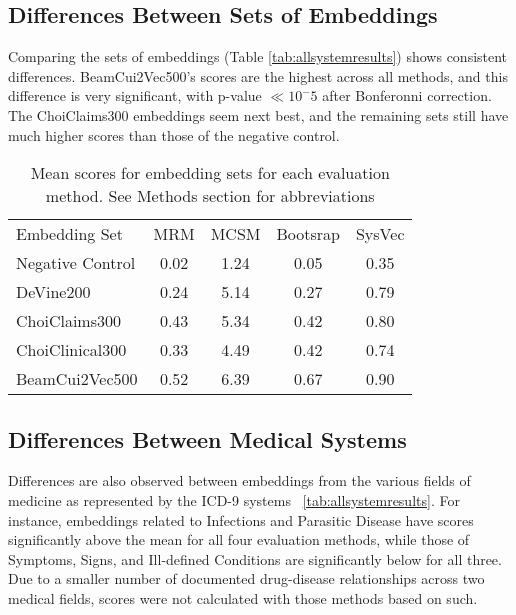 \documentclass[11pt,a4paper]{article}
\begin{document}
\subsection{Differences Between Sets of Embeddings}
Comparing the sets of embeddings (Table \ref{tab:allsystemresults}) shows consistent differences. BeamCui2Vec500's scores are the highest across all methods, and this difference is very significant, with p-value $\ll 10^-5$ after Bonferonni correction. The ChoiClaims300 embeddings seem next best, and the remaining sets still have much higher scores than those of the negative control. 


\begin{table*}[h]
	\begin{center}
		\label{tab:allembedresults}
		\begin{tabular}{l|c|c|c|c}
			Embedding Set &MRM 	        &MCSM              &Bootsrap 	  &SysVec \\
			\hlineB{4}
			Negative Control& 0.02 & 1.24 & 0.05 & 0.35 \\	            
			DeVine200       & 0.24 & 5.14 &	0.27 & 0.79 \\
			ChoiClaims300   & 0.43 & 5.34 &	0.42 & 0.80 \\ 
			ChoiClinical300	& 0.33 & 4.49 &	0.42 & 0.74 \\
			BeamCui2Vec500	& 0.52 & 6.39 & 0.67 & 0.90 \\
		\end{tabular}
		\caption{Mean scores for embedding sets for each evaluation method. See Methods section for abbreviations}
	\end{center}
\end{table*}


\subsection{Differences Between Medical Systems}

Differences are also observed between embeddings from the various fields of medicine as represented by the ICD-9 systems ~\ref{tab:allsystemresults}. For instance, embeddings related to Infections and Parasitic Disease have scores significantly above the mean for all four evaluation methods, while those of Symptoms, Signs, and Ill-defined Conditions are significantly below for all three. Due to a smaller number of documented drug-disease relationships across two medical fields, scores were not calculated with those methods based on such.  
\end{document}
